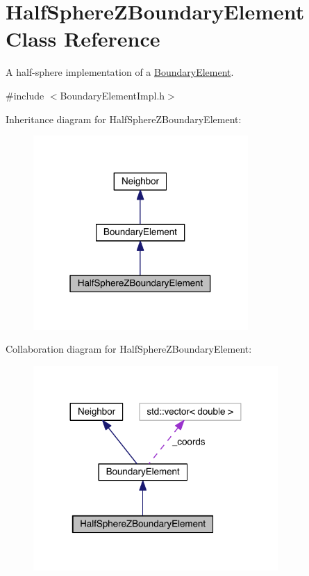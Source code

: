 \hypertarget{classHalfSphereZBoundaryElement}{\section{Half\+Sphere\+Z\+Boundary\+Element Class Reference}
\label{classHalfSphereZBoundaryElement}
}


A half-\/sphere implementation of a \hyperlink{classBoundaryElement}{Boundary\+Element}.  




{\ttfamily \#include $<$Boundary\+Element\+Impl.\+h$>$}



Inheritance diagram for Half\+Sphere\+Z\+Boundary\+Element\+:
\nopagebreak
\begin{figure}[H]
\begin{center}
\leavevmode
\includegraphics[width=232pt]{classHalfSphereZBoundaryElement__inherit__graph}
\end{center}
\end{figure}


Collaboration diagram for Half\+Sphere\+Z\+Boundary\+Element\+:
\nopagebreak
\begin{figure}[H]
\begin{center}
\leavevmode
\includegraphics[width=264pt]{classHalfSphereZBoundaryElement__coll__graph}
\end{center}
\end{figure}

